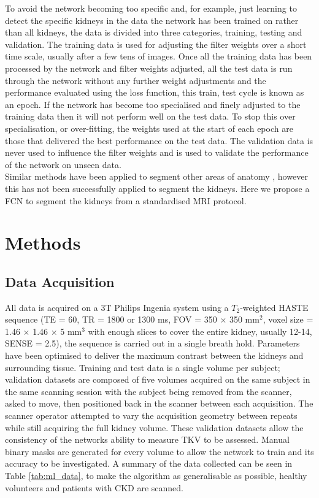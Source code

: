 To avoid the network becoming too specific and, for example, just learning to detect the specific kidneys in the data the network has been trained on rather than all kidneys, the data is divided into three categories, training, testing and validation. The training data is used for adjusting the filter weights over a short time scale, usually after a few tens of images. Once all the training data has been processed by the network and filter weights adjusted, all the test data is run through the network without any further weight adjustments and the performance evaluated using the loss function, this train, test cycle is known as an epoch. If the network has become too specialised and finely adjusted to the training data then it will not perform well on the test data. To stop this over specialisation, or over-fitting, the weights used at the start of each epoch are those that delivered the best performance on the test data. The validation data is never used to influence the filter weights and is used to validate the performance of the network on unseen data.\\

Similar methods have been applied to segment other areas of anatomy \cite{wachinger_deepnat_2018, lu_automatic_2017}, however this has not been successfully applied to segment the kidneys. Here we propose a \ac{FCN} to segment the kidneys from a standardised \ac{MRI} protocol.

\newpage
\section{Methods}

\subsection{Data Acquisition}
\label{sec:ml_methods_acquisition}
All data is acquired on a 3T Philips Ingenia system using a $T_2$-weighted \ac{HASTE} sequence (\ac{TE} = 60, \ac{TR} = 1800 or 1300 ms, \ac{FOV} = 350 $\times$ 350 mm$^2$, voxel size = 1.46 $\times$ 1.46 $\times$ 5 mm$^3$ with enough slices to cover the entire kidney, usually 12-14, \ac{SENSE} = 2.5), the sequence is carried out in a single breath hold. Parameters have been optimised to deliver the maximum contrast between the kidneys and surrounding tissue. Training and test data is a single volume per subject; validation datasets are composed of five volumes acquired on the same subject in the same scanning session with the subject being removed from the scanner, asked to move, then positioned back in the scanner between each acquisition. The scanner operator attempted to vary the acquisition geometry between repeats while still acquiring the full kidney volume. These validation datasets allow the consistency of the networks ability to measure \ac{TKV} to be assessed. Manual binary masks are generated for every volume to allow the network to train and its accuracy to be investigated. A summary of the data collected can be seen in Table \ref{tab:ml_data}, to make the algorithm as generalisable as possible, healthy volunteers and patients with \ac{CKD} are scanned.\\

